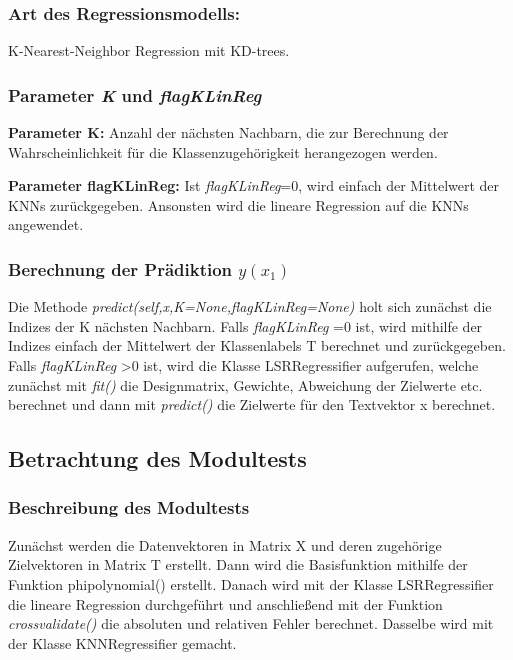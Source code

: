 \subsubsection{ Art des Regressionsmodells: }

\noindent
K-Nearest-Neighbor Regression mit KD-trees. 

\subsubsection{ Parameter \textit{K} und \textit{flagKLinReg} }

\noindent
\textbf{Parameter K:} Anzahl der nächsten Nachbarn, die zur Berechnung der Wahrscheinlichkeit für die Klassenzugehörigkeit herangezogen werden.  

\noindent
\textbf{Parameter flagKLinReg:} Ist \textit{flagKLinReg}=0, wird einfach der Mittelwert der KNNs zurückgegeben.
Ansonsten wird die lineare Regression auf die KNNs angewendet. 

\subsubsection{ Berechnung der Prädiktion \textit{$y(x_1)$} }

Die Methode \textit{predict(self,x,K=None,flagKLinReg=None)} holt sich zunächst die Indizes der K nächsten Nachbarn. 
Falls \textit{ flagKLinReg }=0 ist, wird mithilfe der Indizes einfach der Mittelwert der Klassenlabels T berechnet und zurückgegeben. 
Falls \textit{ flagKLinReg }>0 ist, wird die Klasse LSRRegressifier aufgerufen, welche zunächst mit \textit{ fit() } die Designmatrix, Gewichte, Abweichung der Zielwerte etc. berechnet und dann mit \textit{ predict() } die Zielwerte für den Textvektor x berechnet. 

\subsection{Betrachtung des Modultests}
 
\subsubsection{Beschreibung des Modultests}

Zunächst werden die Datenvektoren in Matrix X und deren zugehörige Zielvektoren in Matrix T erstellt. Dann wird die Basisfunktion mithilfe der Funktion {phi\textunderscore polynomial()} erstellt.
Danach wird mit der Klasse LSRRegressifier die lineare Regression durchgeführt und anschließend mit der Funktion \textit{crossvalidate()} die absoluten und relativen Fehler berechnet. 
Dasselbe wird mit der Klasse KNNRegressifier gemacht. 

